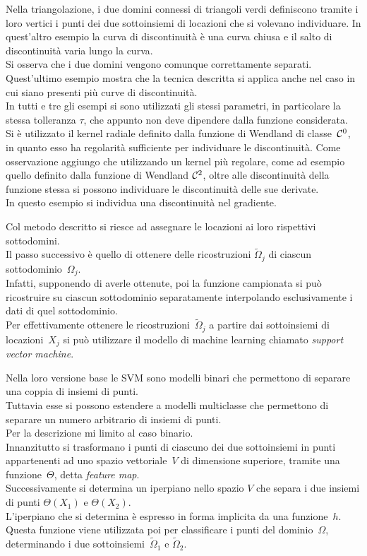 \rf Nella triangolazione, i due domini connessi di triangoli verdi definiscono tramite i loro vertici i punti dei due sottoinsiemi di locazioni che si volevano individuare.\nl
\rf In quest’altro esempio la curva di discontinuità è una curva chiusa e il salto di discontinuità varia lungo la curva.\\
Si osserva che i due domini vengono comunque correttamente separati.\nl
\rf Quest’ultimo esempio mostra che la tecnica descritta si applica anche nel caso in cui siano presenti più curve di discontinuità.\\
In tutti e tre gli esempi si sono utilizzati gli stessi parametri, in particolare la stessa tolleranza $\tau$, che appunto non deve dipendere dalla funzione considerata.\\
Si è utilizzato il kernel radiale definito dalla funzione di Wendland di classe~${\cal C}^0$, in quanto esso ha regolarità sufficiente per individuare le discontinuità.\nl
\rf Come osservazione aggiungo  che utilizzando un kernel più regolare, come ad esempio quello definito dalla funzione di Wendland ${\cal C}^2$, oltre alle discontinuità della funzione stessa si possono individuare le discontinuità delle sue derivate.\\
In questo esempio si individua una discontinuità nel gradiente.



\rf Col metodo descritto si riesce ad assegnare le locazioni ai loro rispettivi sottodomini.\\
Il passo successivo è quello di ottenere delle ricostruzioni $\tilde\Omega_j$ di ciascun sottodominio~$\Omega_j$.\\
Infatti, supponendo di averle ottenute, poi la funzione campionata si può ricostruire su ciascun sottodominio separatamente interpolando esclusivamente i dati di quel sottodominio.\\
Per effettivamente ottenere le ricostruzioni~$\tilde\Omega_j$ a partire dai sottoinsiemi di locazioni~$X_j$ si può utilizzare il modello di machine learning chiamato {\em support vector machine}.



\rf Nella loro versione base le SVM sono modelli binari che permettono di separare una coppia di insiemi di punti.\\
Tuttavia esse si possono estendere a modelli multiclasse che permettono di separare un numero arbitrario di insiemi di punti.\\
Per la descrizione mi limito al caso binario.\\
Innanzitutto si trasformano i punti di ciascuno dei due sottoinsiemi in punti appartenenti ad  uno spazio vettoriale~$V$ di dimensione superiore, tramite una funzione~$\Theta$, detta {\em feature map}.\\  
 Successivamente si determina un iperpiano nello spazio $V$ che separa i due insiemi di punti $\Theta(X_1)$ e $\Theta(X_2)$.\\ 
L’iperpiano che si determina è espresso in forma implicita da una funzione~$h$.\\
Questa funzione viene utilizzata poi per classificare i punti del dominio~$\Omega$, determinando i due sottoinsiemi~$\tilde\Omega_1$ e $\tilde\Omega_2$.


